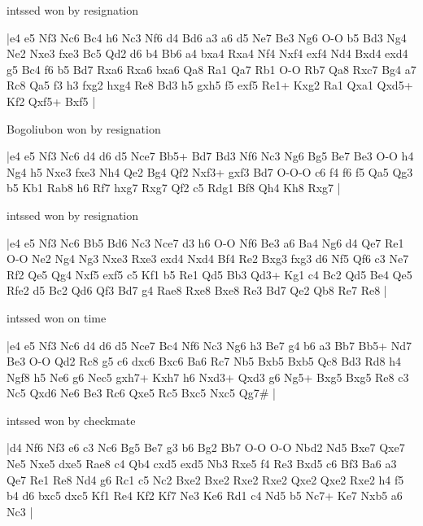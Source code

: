 \showboard

intssed won by resignation

\makegametitle
|e4 e5 Nf3 Nc6 Bc4 h6 Nc3 Nf6 d4 Bd6 a3 a6 d5 Ne7 Be3 Ng6 O-O b5 Bd3 Ng4 Ne2 Nxe3 fxe3 Bc5 Qd2 d6 b4 Bb6 a4 bxa4 Rxa4 Nf4 Nxf4 exf4 Nd4 Bxd4 exd4 g5 Bc4 f6 b5 Bd7 Rxa6 Rxa6 bxa6 Qa8 Ra1 Qa7 Rb1 O-O Rb7 Qa8 Rxc7 Bg4 a7 Rc8 Qa5 f3 h3 fxg2 hxg4 Re8 Bd3 h5 gxh5 f5 exf5 Re1+ Kxg2 Ra1 Qxa1 Qxd5+ Kf2 Qxf5+ Bxf5  |

\showboard

Bogoliubon won by resignation

\makegametitle
|e4 e5 Nf3 Nc6 d4 d6 d5 Nce7 Bb5+ Bd7 Bd3 Nf6 Nc3 Ng6 Bg5 Be7 Be3 O-O h4 Ng4 h5 Nxe3 fxe3 Nh4 Qe2 Bg4 Qf2 Nxf3+ gxf3 Bd7 O-O-O c6 f4 f6 f5 Qa5 Qg3 b5 Kb1 Rab8 h6 Rf7 hxg7 Rxg7 Qf2 c5 Rdg1 Bf8 Qh4 Kh8 Rxg7  |

\showboard

intssed won by resignation

\makegametitle
|e4 e5 Nf3 Nc6 Bb5 Bd6 Nc3 Nce7 d3 h6 O-O Nf6 Be3 a6 Ba4 Ng6 d4 Qe7 Re1 O-O Ne2 Ng4 Ng3 Nxe3 Rxe3 exd4 Nxd4 Bf4 Re2 Bxg3 fxg3 d6 Nf5 Qf6 c3 Ne7 Rf2 Qe5 Qg4 Nxf5 exf5 c5 Kf1 b5 Re1 Qd5 Bb3 Qd3+ Kg1 c4 Bc2 Qd5 Be4 Qe5 Rfe2 d5 Bc2 Qd6 Qf3 Bd7 g4 Rae8 Rxe8 Bxe8 Re3 Bd7 Qe2 Qb8 Re7 Re8  |

\showboard

intssed won on time

\makegametitle
|e4 e5 Nf3 Nc6 d4 d6 d5 Nce7 Bc4 Nf6 Nc3 Ng6 h3 Be7 g4 b6 a3 Bb7 Bb5+ Nd7 Be3 O-O Qd2 Rc8 g5 c6 dxc6 Bxc6 Ba6 Rc7 Nb5 Bxb5 Bxb5 Qc8 Bd3 Rd8 h4 Ngf8 h5 Ne6 g6 Nec5 gxh7+ Kxh7 h6 Nxd3+ Qxd3 g6 Ng5+ Bxg5 Bxg5 Re8 c3 Nc5 Qxd6 Ne6 Be3 Rc6 Qxe5 Rc5 Bxc5 Nxc5 Qg7\#  |

\showboard

intssed won by checkmate

\makegametitle
|d4 Nf6 Nf3 e6 c3 Nc6 Bg5 Be7 g3 b6 Bg2 Bb7 O-O O-O Nbd2 Nd5 Bxe7 Qxe7 Ne5 Nxe5 dxe5 Rae8 c4 Qb4 cxd5 exd5 Nb3 Rxe5 f4 Re3 Bxd5 c6 Bf3 Ba6 a3 Qe7 Re1 Re8 Nd4 g6 Rc1 c5 Nc2 Bxe2 Bxe2 Rxe2 Rxe2 Qxe2 Qxe2 Rxe2 h4 f5 b4 d6 bxc5 dxc5 Kf1 Re4 Kf2 Kf7 Ne3 Ke6 Rd1 c4 Nd5 b5 Nc7+ Ke7 Nxb5 a6 Nc3  |

